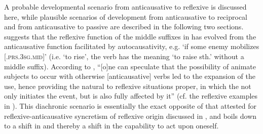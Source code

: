 A probable developmental scenario from anticausative to reflexive is discussed here, while plausible scenarios of development from anticausative to reciprocal and from anticausative to passive are described in the following two sections. \citet[235]{inglese:2020} suggests that the reflexive function of the middle suffixes in  has evolved from the anticausative function facilitated by autocausativity, e.g. ‘if some enemy mobilizes [.\textsc{prs.3sg.mid}]’ (i.e. ‘to rise’, the verb  has the meaning ‘to raise sth.’ without a middle suffix). According to \citet[236]{inglese:2020}, “[o]ne can speculate that the possibility of animate subjects to occur with otherwise [anticausative] verbs led to the expansion of the  use, hence providing the natural  to reflexive situations proper, in which the  not only initiates the event, but is also fully affected by it” (cf. the reflexive examples in ). This diachronic scenario is essentially the exact opposite of that attested for reflexive-anticausative syncretism of reflexive origin discussed in , and boils down to a shift in  and thereby a shift in the capability to act upon oneself.

